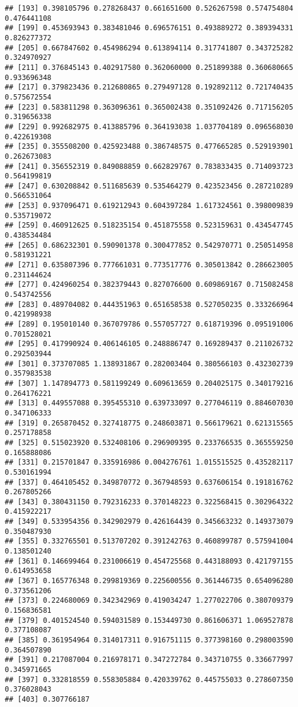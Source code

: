 \documentclass[
]{article}
\begin{document}
\begin{verbatim}
## [193] 0.398105796 0.278268437 0.661651600 0.526267598 0.574754804 0.476441108
## [199] 0.453693943 0.383481046 0.696576151 0.493889272 0.389394331 0.826277372
## [205] 0.667847602 0.454986294 0.613894114 0.317741807 0.343725282 0.324970927
## [211] 0.376845143 0.402917580 0.362060000 0.251899388 0.360680665 0.933696348
## [217] 0.379823436 0.212680865 0.279497128 0.192892112 0.721740435 0.575672554
## [223] 0.583811298 0.363096361 0.365002438 0.351092426 0.717156205 0.319656338
## [229] 0.992682975 0.413885796 0.364193038 1.037704189 0.096568030 0.422619308
## [235] 0.355508200 0.425923488 0.386748575 0.477665285 0.529193901 0.262673083
## [241] 0.356552319 0.849088859 0.662829767 0.783833435 0.714093723 0.564199819
## [247] 0.630208842 0.511685639 0.535464279 0.423523456 0.287210289 0.566531064
## [253] 0.937096471 0.619212943 0.604397284 1.617324561 0.398009839 0.535719072
## [259] 0.460912625 0.518235154 0.451875558 0.523159631 0.434547745 0.438534484
## [265] 0.686232301 0.590901378 0.300477852 0.542970771 0.250514958 0.581931221
## [271] 0.635807396 0.777661031 0.773517776 0.305013842 0.286623005 0.231144624
## [277] 0.424960254 0.382379443 0.827076600 0.609869167 0.715082458 0.543742556
## [283] 0.489704082 0.444351963 0.651658538 0.527050235 0.333266964 0.421998938
## [289] 0.195010140 0.367079786 0.557057727 0.618719396 0.095191006 0.701528021
## [295] 0.417990924 0.406146105 0.248886747 0.169289437 0.211026732 0.292503944
## [301] 0.373707085 1.138931867 0.282003404 0.380566103 0.432302739 0.357983538
## [307] 1.147894773 0.581199249 0.609613659 0.204025175 0.340179216 0.264176221
## [313] 0.449557088 0.395455310 0.639733097 0.277046119 0.884607030 0.347106333
## [319] 0.265870452 0.327418775 0.248603871 0.566179621 0.621315565 0.257178858
## [325] 0.515023920 0.532408106 0.296909395 0.233766535 0.365559250 0.165888086
## [331] 0.215701847 0.335916986 0.004276761 1.015515525 0.435282117 0.530161994
## [337] 0.464105452 0.349870772 0.367948593 0.637606154 0.191816762 0.267805266
## [343] 0.380431150 0.792316233 0.370148223 0.322568415 0.302964322 0.415922217
## [349] 0.533954356 0.342902979 0.426164439 0.345663232 0.149373079 0.350487930
## [355] 0.332765501 0.513707202 0.391242763 0.460899787 0.575941004 0.138501240
## [361] 0.146699464 0.231006619 0.454725568 0.443188093 0.421797155 0.614953658
## [367] 0.165776348 0.299819369 0.225600556 0.361446735 0.654096280 0.373561206
## [373] 0.224680069 0.342342969 0.419034247 1.277022706 0.380709379 0.156836581
## [379] 0.401524540 0.594031589 0.153449730 0.861606371 1.069527878 0.377108087
## [385] 0.361954964 0.314017311 0.916751115 0.377398160 0.298003590 0.364507890
## [391] 0.217087004 0.216978171 0.347272784 0.343710755 0.336677997 0.345971665
## [397] 0.332818559 0.558305884 0.420339762 0.445755033 0.278607350 0.376028043
## [403] 0.307766187
\end{verbatim}
\end{document}
